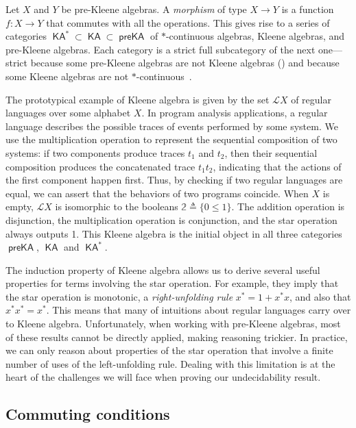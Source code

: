 \documentclass[11pt,a4paper]{amsart}
\theoremstyle{definition}
\DeclareMathOperator{\preKA}{\mathsf{preKA}}
\DeclareMathOperator{\KA}{\mathsf{KA}}
\begin{document}
Let $X$ and $Y$ be pre-Kleene algebras.  A \emph{morphism} of type $X \to Y$ is
a function $f : X \to Y$ that commutes with all the operations.  This gives rise
to a series of categories $\KA^* \subset \KA \subset \preKA$ of $*$-continuous
algebras, Kleene algebras, and pre-Kleene algebras. Each category is a strict
full subcategory of the next one---strict because some pre-Kleene algebras are
not Kleene algebras () and because some Kleene
algebras are not $*$-continuous~\cite{kozen_KleeneAlgebrasClosed_1990}.

The prototypical example of Kleene algebra is given by the set $\mathcal{L}X$ of
regular languages over some alphabet $X$.  In program analysis applications, a
regular language describes the possible traces of events performed by some
system. We use the multiplication operation to represent the sequential
composition of two systems: if two components produce traces $t_1$ and $t_2$,
then their sequential composition produces the concatenated trace $t_1t_2$,
indicating that the actions of the first component happen first.  Thus, by
checking if two regular languages are equal, we can assert that the behaviors of
two programs coincide.  When $X$ is empty, $\mathcal{L}X$ is isomorphic to the
booleans $\mathbb{2}  \triangleq  \{0 \leq 1\}$.  The addition operation is disjunction, the
multiplication operation is conjunction, and the star operation always outputs
1. This Kleene algebra is the initial object in all three categories $\preKA$,
$\KA$ and $\KA^*$.

The induction property of Kleene algebra allows us to derive several useful
properties for terms involving the star operation.  For example, they imply that
the star operation is monotonic, a \emph{right-unfolding rule} $x^* = 1 + x^*x$,
and also that $x^*x^* = x^*$.  This means that many of intuitions about regular
languages carry over to Kleene algebra.  Unfortunately, when working with
pre-Kleene algebras, most of these results cannot be directly applied, making
reasoning trickier.  In practice, we can only reason about properties of the
star operation that involve a finite number of uses of the left-unfolding rule.
Dealing with this limitation is at the heart of the challenges we will face when
proving our undecidability result.

\subsection{Commuting conditions}
\end{document}
